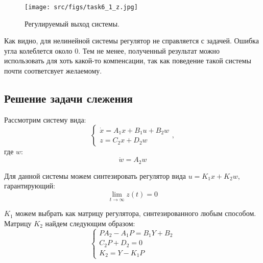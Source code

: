 \begin{figure}[ht!]
        \centering
        \texttt{[image: src/figs/task6\_1\_z.jpg]}
        \caption{Регулируемый выход системы.}
        \label{fig:task6_1_z}
\end{figure}

Как видно, для нелинейной системы регулятор не справляется с задачей. Ошибка угла колеблется около 0. Тем не менее, полученный результат можно использовать для хоть какой-то компенсации, так как поведение такой системы почти соответсвует желаемому.
\FloatBarrier

\subsection{Решение задачи слежения}
Рассмотрим систему вида:
\[
    \begin{cases}
        \dot{x} = A_1x + B_1u + B_2w \\
        z = C_2x + D_2w
    \end{cases},
\]
где $w$:
\[
    \dot{w} = A_2w
\]

Для данной системы можем синтезировать регулятор вида $u = K_1x + K_2w$, гарантирующий:
\begin{equation*}
    \lim_{t\to\infty} z(t) = 0
\end{equation*}

$K_1$ можем выбрать как матрицу регулятора, синтезированного любым способом. Матрицу $K_2$ найдем следующим образом:
\[
    \begin{cases}
        PA_2 - A_1P = B_1Y + B_2\\
        C_2P + D_2 = 0 \\
        K_2 = Y - K_1P
    \end{cases}
\]

